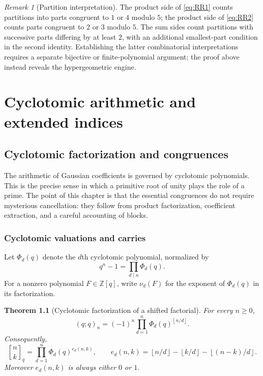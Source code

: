 \documentclass[11pt,oneside,openany]{book}
\newtheorem{theorem}{Theorem}[chapter]
\theoremstyle{definition}
\theoremstyle{remark}
\newtheorem{remark}[remark]{Remark}
\newcommand{\qbinom}[2]{\genfrac{[}{]}{0pt}{}{#1}{#2}_{q}}
\newcommand{\Z}{\mathbb Z}
\newcommand{\floor}[1]{\left\lfloor #1\right\rfloor}
\begin{document}
\begin{remark}[Partition interpretation]
The product side of \eqref{eq:RR1} counts partitions into parts congruent to $1$ or $4$ modulo $5$; the product side of \eqref{eq:RR2} counts parts congruent to $2$ or $3$ modulo $5$.  The sum sides count partitions with successive parts differing by at least $2$, with an additional smallest-part condition in the second identity.  Establishing the latter combinatorial interpretations requires a separate bijective or finite-polynomial argument; the proof above instead reveals the hypergeometric engine.
\end{remark}


\part{Cyclotomic arithmetic and extended indices}

\chapter{Cyclotomic factorization and congruences}\label{chap:cyclotomic}

The arithmetic of Gaussian coefficients is governed by cyclotomic polynomials.  This is the precise sense in which a primitive root of unity plays the role of a prime.  The point of this chapter is that the essential congruences do not require mysterious cancellation: they follow from product factorization, coefficient extraction, and a careful accounting of blocks.

\section{Cyclotomic valuations and carries}

Let $\Phi_d(q)$ denote the $d$th cyclotomic polynomial, normalized by
\[
 q^n-1=\prod_{d\mid n}\Phi_d(q).
\]
For a nonzero polynomial $F\in\Z[q]$, write $\nu_d(F)$ for the exponent of $\Phi_d(q)$ in its factorization.

\begin{theorem}[Cyclotomic factorization of a shifted factorial]\label{thm:cyclotomic-pochhammer}
For every $n\ge0$,
\[
 (q;q)_n=(-1)^n\prod_{d=1}^{n}\Phi_d(q)^{\floor{n/d}}.
\]
Consequently,
\[
 \qbinom nk
 =\prod_{d=1}^{n}\Phi_d(q)^{e_d(n,k)},
 \qquad
 e_d(n,k)=\floor{n/d}-\floor{k/d}-\floor{(n-k)/d}.
 \tag{16.1}\label{eq:cyclotomic-gaussian}
\]
Moreover $e_d(n,k)$ is always either $0$ or $1$.
\end{theorem}
\end{document}
